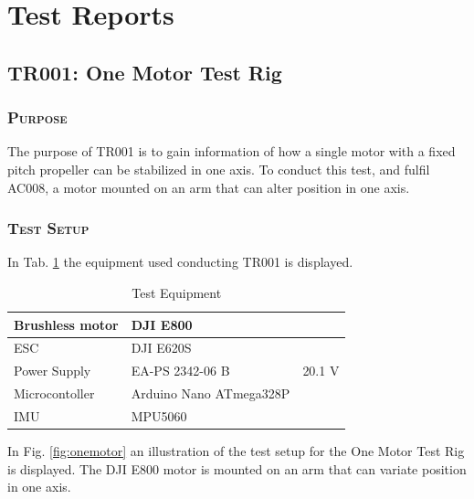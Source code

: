 \section{Test Reports}
\subsection{TR001: One Motor Test Rig}
         {}

\subsubsection*{\textsc{\medium Purpose}}
The purpose of TR001 is to gain information of how a single motor with a fixed pitch propeller can be stabilized in one axis. To conduct this test, and fulfil AC008, a motor mounted on an arm that can alter position in one axis. 

\subsubsection*{\textsc{\medium Test Setup}}
In Tab. \ref{tab:tab1} the equipment used conducting TR001 is displayed. 
\begin {table}[H]
    \begin{center}
    \caption {Test Equipment} 
    \label{tab:tab1} 
    \begin{tabular}{|l|l|l|}\hline 
        Brushless motor    & DJI E800   &\\ \hline
        ESC         & DJI E620S     &\\ \hline
        Power Supply & EA-PS 2342-06 B  & 20.1 V   \\ \hline
        Microcontoller & Arduino Nano ATmega328P \\ \hline
        IMU & MPU5060 \\ \hline
    \end{tabular}
    \end{center}
\end{table}

\noindent
In Fig. \ref{fig:onemotor} an illustration of the test setup for the One Motor Test Rig is displayed. The DJI E800 motor is mounted on an arm that can variate position in one axis. 

